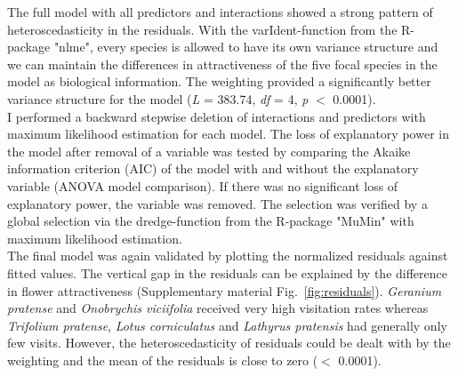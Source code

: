 The full model with all predictors and interactions showed a strong pattern of heteroscedasticity in the residuals. With the varIdent-function from the R-package "nlme", every species is allowed to have its own variance structure and we can maintain the differences in attractiveness of the five focal species in the model as biological information. The weighting provided a significantly better variance structure for the model (\textit{L} = 383.74, \textit{df} = 4, \textit{p} $<$ 0.0001).\\
I performed a backward stepwise deletion of interactions and predictors with maximum likelihood estimation for each model. The loss of explanatory power in the model after removal of a variable was tested by comparing the Akaike information criterion (AIC) of the model with and without the explanatory variable (ANOVA model comparison). If there was no significant loss of explanatory power, the variable was removed. The selection was verified by a global selection via the dredge-function from the R-package "MuMin" \citep{MuMIn} with maximum likelihood estimation. \\
The final model was again validated by plotting the normalized residuals against fitted values. The vertical gap in the residuals can be explained by the difference in flower attractiveness (Supplementary material Fig.~\ref{fig:residuals}). \textit{Geranium pratense} and \textit{Onobrychis viciifolia} received very high visitation rates whereas \textit{Trifolium pratense}, \textit{Lotus corniculatus} and \textit{Lathyrus pratensis} had generally only few visits. However, the heteroscedasticity of residuals could be dealt with by the weighting and the mean of the residuals is close to zero ($<$ 0.0001). 

